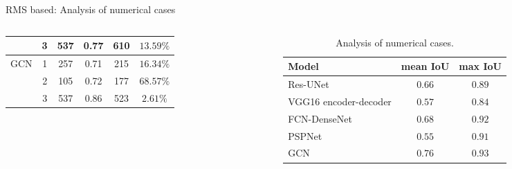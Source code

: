 \documentclass[10pt,aspectratio=169,dvipsnames]{beamer} %
\begin{document}
\begin{frame}{RMS based: Analysis of numerical cases}
\begin{columns}[T]
\begin{column}[t]{0.48\textwidth}
\begin{table}
\begin{tabular}{cccccc}
						& 3 & 537 & \multicolumn{1}{c}{0.77} & \multicolumn{1}{c}{610} & \(13.59\%\) \\ 
						\midrule
						\multirow{3}{*}{GCN} 
						& 1 & 257 & \multicolumn{1}{c}{0.71} & \multicolumn{1}{c}{215} & \(16.34\%\) \\ 
						& 2 & 105 & \multicolumn{1}{c}{0.72} & \multicolumn{1}{c}{177} & \(68.57\%\) \\ 
						& 3 & 537 & \multicolumn{1}{c}{0.86} & \multicolumn{1}{c}{523} & \(2.61\%\) \\ 
						\bottomrule[1.5pt]
					\end{tabular}	
				\end{table}
			\end{column}
			\begin{column}[t]{0.48\textwidth}
				\begin{table}
					\caption{Analysis of numerical cases.}
					\label{tab:table_all_numerical_cases_backup}	
					\begin{tabular}{lcc}
						\toprule[1.5pt]
						Model & mean IoU & max IoU \\ 
						\midrule 
						Res-UNet & \(0.66\) & \(0.89\) \\ 
						VGG16 encoder-decoder & \(0.57\) & \(0.84\) \\ 
						FCN-DenseNet & \(0.68\) & \(0.92\) \\ 
						PSPNet & \(0.55\) & \(0.91\) \\ 
						GCN & \(0.76\) & \(0.93\) \\ 
						\bottomrule[1.5pt]
					\end{tabular}
				\end{table}
			\end{column}
		\end{columns}
	\end{frame}
\end{document}
